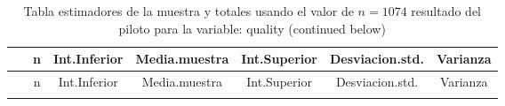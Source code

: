 \documentclass[
]{article}
\begin{document}
\begin{longtable}[]{@{}ccccccc@{}}
\caption{Tabla estimadores de la muestra y totales usando el valor de
\(n = 1074\) resultado del piloto para la variable: quality (continued
below)}\tabularnewline
\toprule
\begin{minipage}[b]{0.20\columnwidth}\centering
~\strut
\end{minipage} & \begin{minipage}[b]{0.05\columnwidth}\centering
n\strut
\end{minipage} & \begin{minipage}[b]{0.11\columnwidth}\centering
Int.Inferior\strut
\end{minipage} & \begin{minipage}[b]{0.12\columnwidth}\centering
Media.muestra\strut
\end{minipage} & \begin{minipage}[b]{0.11\columnwidth}\centering
Int.Superior\strut
\end{minipage} & \begin{minipage}[b]{0.13\columnwidth}\centering
Desviacion.std.\strut
\end{minipage} & \begin{minipage}[b]{0.09\columnwidth}\centering
Varianza\strut
\end{minipage}\tabularnewline
\midrule
\endfirsthead
\toprule
\begin{minipage}[b]{0.20\columnwidth}\centering
~\strut
\end{minipage} & \begin{minipage}[b]{0.05\columnwidth}\centering
n\strut
\end{minipage} & \begin{minipage}[b]{0.11\columnwidth}\centering
Int.Inferior\strut
\end{minipage} & \begin{minipage}[b]{0.12\columnwidth}\centering
Media.muestra\strut
\end{minipage} & \begin{minipage}[b]{0.11\columnwidth}\centering
Int.Superior\strut
\end{minipage} & \begin{minipage}[b]{0.13\columnwidth}\centering
Desviacion.std.\strut
\end{minipage} & \begin{minipage}[b]{0.09\columnwidth}\centering
Varianza\strut
\end{minipage}\tabularnewline
\midrule
\endhead
\begin{minipage}[t]{0.20\columnwidth}\centering

\end{minipage}
\end{longtable}
\end{document}
